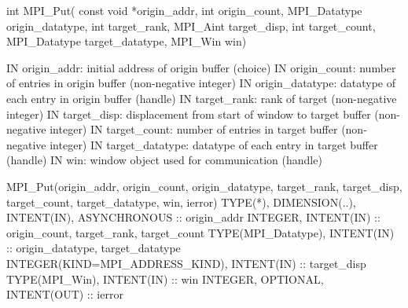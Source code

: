 int MPI_Put(
  const void *origin_addr, int origin_count, MPI_Datatype origin_datatype,
  int target_rank, MPI_Aint target_disp, int target_count, MPI_Datatype target_datatype,
  MPI_Win win)

IN origin_addr: initial address of origin buffer (choice)
IN origin_count: number of entries in origin buffer (non-negative integer)
IN origin_datatype: datatype of each entry in origin buffer (handle)
IN target_rank: rank of target (non-negative integer)
IN target_disp: displacement from start of window to target buffer (non-negative integer)
IN target_count: number of entries in target buffer (non-negative integer)
IN target_datatype: datatype of each entry in target buffer (handle)
IN win: window object used for communication (handle)

MPI_Put(origin_addr, origin_count, origin_datatype,
  target_rank, target_disp, target_count, target_datatype, win, ierror)
TYPE(*), DIMENSION(..), INTENT(IN), ASYNCHRONOUS :: origin_addr
INTEGER, INTENT(IN) :: origin_count, target_rank, target_count
TYPE(MPI_Datatype), INTENT(IN) :: origin_datatype, target_datatype
INTEGER(KIND=MPI_ADDRESS_KIND), INTENT(IN) :: target_disp
TYPE(MPI_Win), INTENT(IN) :: win
INTEGER, OPTIONAL, INTENT(OUT) :: ierror
